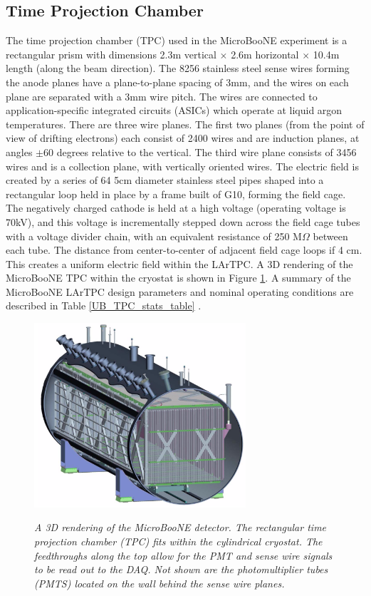 \subsection{Time Projection Chamber}
The time projection chamber (TPC) used in the MicroBooNE experiment is a rectangular prism with dimensions 2.3m vertical $\times$ 2.6m horizontal $\times$ 10.4m length (along the beam direction). The 8256 stainless steel sense wires forming the anode planes have a plane-to-plane spacing of 3mm, and the wires on each plane are separated with a 3mm wire pitch. The wires are connected to application-specific integrated circuits (ASICs) which operate at liquid argon temperatures. There are three wire planes. The first two planes (from the point of view of drifting electrons) each consist of 2400 wires and are induction planes, at angles $\pm60$ degrees relative to the vertical. The third wire plane consists of 3456 wires and is a collection plane, with vertically oriented wires. The electric field is created by a series of 64 5cm diameter stainless steel pipes shaped into a rectangular loop held in place by a frame built of G10, forming the field cage. The negatively charged cathode is held at a high voltage (operating voltage is 70kV), and this voltage is incrementally stepped down across the field cage tubes with a voltage divider chain, with an equivalent resistance of 250 M$\Omega$ between each tube. The distance from center-to-center of adjacent field cage loops if 4 cm. This creates a uniform electric field within the LArTPC. A 3D rendering of the MicroBooNE TPC within the cryostat is shown in Figure \ref{cryo_3D_rendering_fig}. A summary of the MicroBooNE LArTPC design parameters and nominal operating conditions are described in Table \ref{UB_TPC_stats_table} \cite{UBDetectorPaper}.


\begin{figure}[ht!]
\centering
	\includegraphics[width=0.7\textwidth]{Figures/cryo_3D_rendering.png} \\
\caption{\textit{A 3D rendering of the MicroBooNE detector. The rectangular time projection chamber (TPC) fits within the cylindrical cryostat. The feedthroughs along the top allow for the PMT and sense wire signals to be read out to the DAQ. Not shown are the photomultiplier tubes (PMTS) located on the wall behind the sense wire planes.}}\label{cryo_3D_rendering_fig}
\end{figure}


